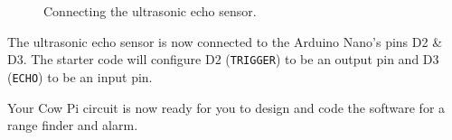 \begin{figure}
{        \label{fig:ultrasonicD2D3}
    }
    \hfil
    \hfil
    \caption{Connecting the ultrasonic echo sensor.}
\end{figure}

The ultrasonic echo sensor is now connected to the Arduino Nano's pins D2 \& D3.
The starter code will configure D2 (\lstinline{TRIGGER}) to be an output pin and D3 (\lstinline{ECHO}) to be an input pin.


\vspace{1cm}

Your Cow Pi circuit is now ready for you to design and code the software for a range finder and alarm.
